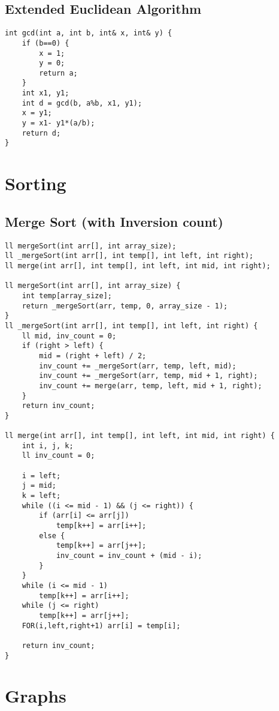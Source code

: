 \documentclass{article}
\begin{document}
    \subsection{Extended Euclidean Algorithm}
    
    \begin{lstlisting}
int gcd(int a, int b, int& x, int& y) {
    if (b==0) {
        x = 1;
        y = 0;
        return a;
    }
    int x1, y1;
    int d = gcd(b, a%b, x1, y1);
    x = y1;
    y = x1- y1*(a/b);
    return d;
}
    \end{lstlisting}

    \section{Sorting}
        \subsection{Merge Sort (with Inversion count)}


        \begin{lstlisting}
ll mergeSort(int arr[], int array_size);
ll _mergeSort(int arr[], int temp[], int left, int right);
ll merge(int arr[], int temp[], int left, int mid, int right);

ll mergeSort(int arr[], int array_size) {
    int temp[array_size];
    return _mergeSort(arr, temp, 0, array_size - 1);
}
ll _mergeSort(int arr[], int temp[], int left, int right) {
    ll mid, inv_count = 0;
    if (right > left) {
        mid = (right + left) / 2;
        inv_count += _mergeSort(arr, temp, left, mid);
        inv_count += _mergeSort(arr, temp, mid + 1, right);
        inv_count += merge(arr, temp, left, mid + 1, right);
    }
    return inv_count;
}

ll merge(int arr[], int temp[], int left, int mid, int right) {
    int i, j, k;
    ll inv_count = 0;

    i = left;
    j = mid;
    k = left;
    while ((i <= mid - 1) && (j <= right)) {
        if (arr[i] <= arr[j])
            temp[k++] = arr[i++];
        else {
            temp[k++] = arr[j++];
            inv_count = inv_count + (mid - i);
        }
    }
    while (i <= mid - 1)
        temp[k++] = arr[i++];
    while (j <= right)
        temp[k++] = arr[j++];
    FOR(i,left,right+1) arr[i] = temp[i];

    return inv_count;
}       \end{lstlisting}


    \section{Graphs}
\end{document}
